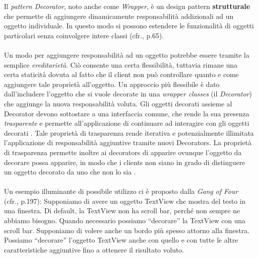 \documentclass[12pt]{article}
\begin{document}
Il {\em pattern Decorator}, noto anche come {\em Wrapper}, è un design pattern \textbf{strutturale} che permette di aggiungere dinamicamente responsabilità addizionali ad un oggetto individuale. In questo modo si possono estendere le funzionalità di oggetti particolari senza coinvolgere intere classi (cfr.\cite{gof_sunt}, p.65).
\\
\\
Un modo per aggiungere responsabilità ad un oggetto potrebbe essere tramite la semplice {\em ereditarietà}. Ciò consente una certa flessibilità, tuttavia rimane una certa staticità dovuta al fatto che il client non può controllare quanto e come aggiungere tale proprietà all'oggetto.
Un approccio più flessibile è dato dall'includere l'oggetto che si vuole decorate in una {\em wrapper classes} (il {\em Decorator}) che aggiunge la nuova responsabilità voluta. Gli oggetti decorati assieme al Decorator devono sottostare a una interfaccia comune, che rende la sua presenza {\em trasparente} e permette all’applicazione di continuare ad interagire con gli oggetti decorati \cite{gof_sunt}. Tale proprietà di trasparenza rende iterativa e potenzialmente illimitata l'applicazione di responsabilità aggiuntive tramite nuovi Decorators.
La proprietà di trasparenza permette inoltre ai decorators di apparire ovunque l'oggetto da decorare possa apparire, in modo che i clients non siano in grado di distinguere un oggetto decorato da uno che non lo sia \cite{gof_riferimento}.
\\
\\
Un esempio illuminante di possibile utilizzo ci è proposto dalla {\em Gang of Four} (cfr.\cite{gof_riferimento}, p.197):
Supponiamo di avere un oggetto TextView che mostra del testo in una finestra. Di default, la TextView non ha scroll bar, perch\'e non sempre ne abbiamo bisogno. Quando necessario possiamo ``decorare'' la TextView con una scroll bar. Supponiamo di volere anche un bordo più spesso attorno alla finestra. Possiamo ``decorare'' l'oggetto TextView anche con quello e con tutte le altre caratteristiche aggiuntive fino a ottenere il risultato voluto.
\end{document}
